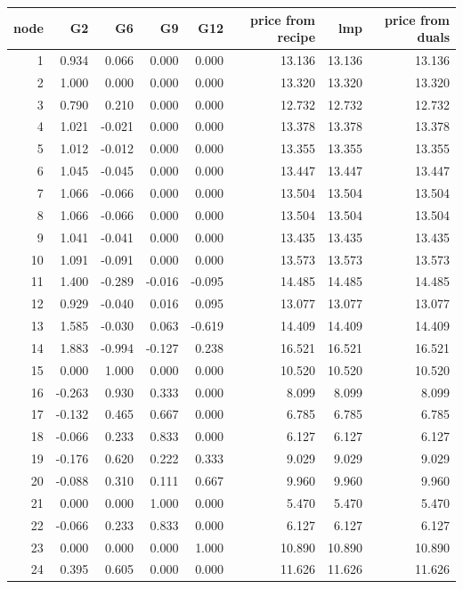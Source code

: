 \begin{tabular}{rrrrrrrr}
\toprule
node & G2 & G6 & G9 & G12 & price from recipe & lmp & price from duals \\
\midrule
1 & 0.934 & 0.066 & 0.000 & 0.000 & 13.136 & 13.136 & 13.136 \\
2 & 1.000 & 0.000 & 0.000 & 0.000 & 13.320 & 13.320 & 13.320 \\
3 & 0.790 & 0.210 & 0.000 & 0.000 & 12.732 & 12.732 & 12.732 \\
4 & 1.021 & -0.021 & 0.000 & 0.000 & 13.378 & 13.378 & 13.378 \\
5 & 1.012 & -0.012 & 0.000 & 0.000 & 13.355 & 13.355 & 13.355 \\
6 & 1.045 & -0.045 & 0.000 & 0.000 & 13.447 & 13.447 & 13.447 \\
7 & 1.066 & -0.066 & 0.000 & 0.000 & 13.504 & 13.504 & 13.504 \\
8 & 1.066 & -0.066 & 0.000 & 0.000 & 13.504 & 13.504 & 13.504 \\
9 & 1.041 & -0.041 & 0.000 & 0.000 & 13.435 & 13.435 & 13.435 \\
10 & 1.091 & -0.091 & 0.000 & 0.000 & 13.573 & 13.573 & 13.573 \\
11 & 1.400 & -0.289 & -0.016 & -0.095 & 14.485 & 14.485 & 14.485 \\
12 & 0.929 & -0.040 & 0.016 & 0.095 & 13.077 & 13.077 & 13.077 \\
13 & 1.585 & -0.030 & 0.063 & -0.619 & 14.409 & 14.409 & 14.409 \\
14 & 1.883 & -0.994 & -0.127 & 0.238 & 16.521 & 16.521 & 16.521 \\
15 & 0.000 & 1.000 & 0.000 & 0.000 & 10.520 & 10.520 & 10.520 \\
16 & -0.263 & 0.930 & 0.333 & 0.000 & 8.099 & 8.099 & 8.099 \\
17 & -0.132 & 0.465 & 0.667 & 0.000 & 6.785 & 6.785 & 6.785 \\
18 & -0.066 & 0.233 & 0.833 & 0.000 & 6.127 & 6.127 & 6.127 \\
19 & -0.176 & 0.620 & 0.222 & 0.333 & 9.029 & 9.029 & 9.029 \\
20 & -0.088 & 0.310 & 0.111 & 0.667 & 9.960 & 9.960 & 9.960 \\
21 & 0.000 & 0.000 & 1.000 & 0.000 & 5.470 & 5.470 & 5.470 \\
22 & -0.066 & 0.233 & 0.833 & 0.000 & 6.127 & 6.127 & 6.127 \\
23 & 0.000 & 0.000 & 0.000 & 1.000 & 10.890 & 10.890 & 10.890 \\
24 & 0.395 & 0.605 & 0.000 & 0.000 & 11.626 & 11.626 & 11.626 \\
\bottomrule
\end{tabular}
